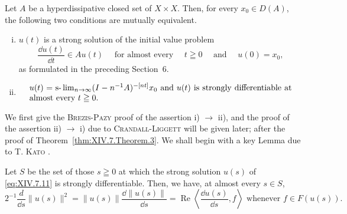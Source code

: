 \begin{theorem}\label{thm:XIV.7.Theorem.2} Let $A$ be a hyperdissipative closed set of $X \times X$. Then, for every $x_{0} \in D(A)$, the following two conditions are mutually equivalent.
\begin{enumerate}[i)]
\item $u(t)$ is a strong solution of the initial value problem 
\begin{equation}\label{eq:XIV.7.11}
\frac {\dd u (t)}{\dd t} \in A u (t) \quad \text{ for almost every } \quad t \geqq 0 \quad \text{ and } \quad u (0) = x _{0},
\end{equation}
as formulated in the preceding Section~\hyperref[sec:XIV.6]{$6$}. 

\item 
\begin{equation}
\label{eq:XIV.7.12}
\begin{minipage}{0.92\linewidth}
\everymath{}\let\limits\nolimits
$u (t) = \slim _{n \rightarrow \infty} (I - n ^{-1} A) ^{-[nt]} x _{0}$ and $u (t)$ is strongly differentiable at almost every $t \geqq 0.$
\end{minipage}
\end{equation}
\end{enumerate}
\end{theorem}

We first give the \textsc{Brezis}-\textsc{Pazy} \cite{brezis29} proof of the assertion i) $\to$ ii), and the proof of the assertion ii) $\to$ i) due to \textsc{Crandall}-\textsc{Liggett} \cite{clarkson37} will be given later; after the proof of Theorem~\ref{thm:XIV.7.Theorem.3}. We shall begin with a key Lemma due to T. \textsc{Kato} \cite{kato144}. 

\begin{lemmau} Let $S$ be the set of those $s \geqq 0$ at which the strong solution $u(s)$ of \eqref{eq:XIV.7.11} is strongly differentiable. Then, we have, at almost every $s \in S$, 
\begin{equation}\label{eq:XIV.7.13}
2 ^{-1} \frac {d}{\dd s} \| u (s) \| ^{2} = \| u (s) \| \frac {\dd \| u (s) \|}{\dd s} = \operatorname{Re} \left\langle \frac {\dd u (s)}{\dd s}, f \right\rangle \text{ whenever } f \in F (u (s)).
\end{equation}
\end{lemmau}

